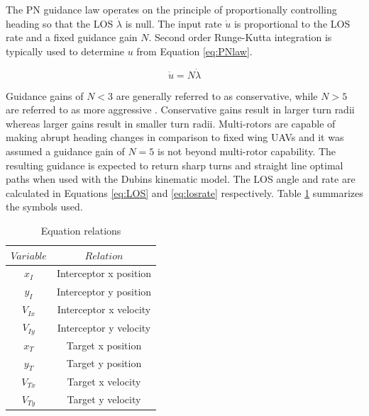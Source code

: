 \documentclass[conference]{IEEEtran}
\begin{document}
The PN guidance law operates on the principle of proportionally controlling heading so that the LOS $\dot{\lambda}$ is null. The input rate $\dot{u}$ is proportional to the LOS rate and a fixed guidance gain $N$. Second order Runge-Kutta integration is typically used to determine $u$ from Equation \ref{eq:PNlaw}.

\begin{equation} \label{eq:PNlaw}
\dot{u} = N\dot{\lambda}
\end{equation}


Guidance gains of $N < 3$ are generally referred to as conservative, while $N > 5$ are referred to as more aggressive \cite{zarchan}. Conservative gains result in larger turn radii whereas larger gains result in smaller turn radii. Multi-rotors are capable of making abrupt heading changes in comparison to fixed wing UAVs and it was assumed a guidance gain of $N = 5$ is not beyond multi-rotor capability. The resulting guidance is expected to return sharp turns and straight line optimal paths when used with the Dubins kinematic model. The LOS angle and rate are calculated in Equations \ref{eq:LOS} and \ref{eq:losrate} respectively. Table \ref{relations} summarizes the symbols used.
 
 \begin{table}
 \centering
 \caption{Equation relations}
 \begin{tabular}{cc}
 	\label{relations}

 	$Variable$ & $Relation$ \\
 	\hline 
 	$x_I$  & Interceptor x position \\ 
 	
 	$y_I$ & Interceptor y position \\ 
 	
 	$V_{Ix}$ & Interceptor x velocity \\ 
 	
 	$V_{Iy}$ & Interceptor y velocity \\ 
 	
 	$x_T$ & Target x position \\ 
 	
 	$y_T$ & Target y position \\ 
 	
 	$V_{Tx}$ & Target x velocity \\ 
 	
 	$V_{Ty}$ & Target y velocity \\ 

 \end{tabular}
 \end{table}
\end{document}
